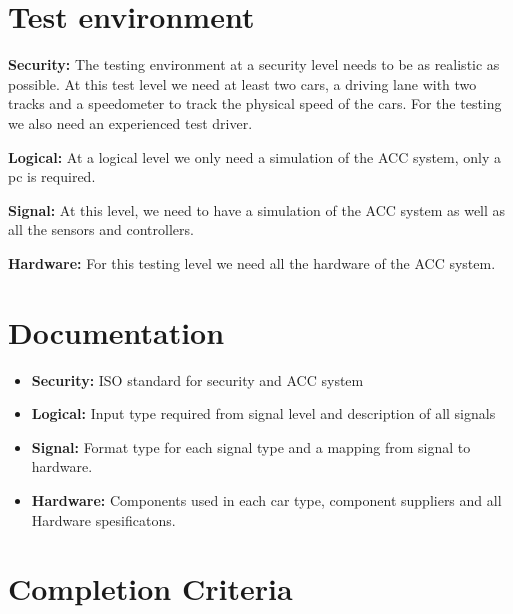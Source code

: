 	
	\clearpage
	\section{Test environment}	

		{\bf Security:} The testing environment at a security level needs to be as realistic 
		as possible. At this test level we need at least two cars, a driving lane with two tracks 
		and a speedometer to track the physical speed of the cars. For the testing we also need
		an experienced test driver. 

		{\bf Logical:} At a logical level we only need a simulation of the ACC system, only a pc 
		is required.
				
		{\bf Signal:} At this level, we need to have a simulation of the ACC system as well as all
		the sensors and controllers.

		{\bf Hardware:} For this testing level we need all the hardware of the ACC system.

	\section{Documentation}

		\begin{itemize}
			\item {\bf Security:} ISO standard for security and ACC system
			\item {\bf Logical:} Input type required from signal level and 
			description of all signals
			\item {\bf Signal:} Format type for each signal type and a mapping 
			from signal to hardware.
 			\item {\bf Hardware:} Components used in each car type, component 
 			suppliers and all Hardware spesificatons.
 		\end{itemize}

	\clearpage
	\section{Completion Criteria}

